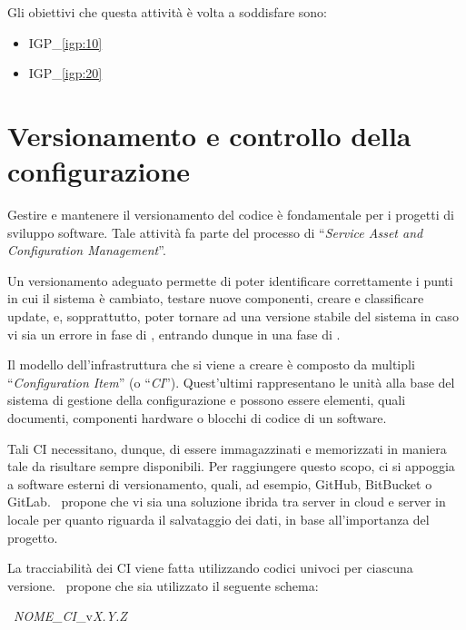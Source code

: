 		Gli obiettivi che questa attività è volta a soddisfare sono:
		\begin{itemize}[noitemsep]
			\renewcommand\labelitemi{--}
			\item {\color{pantone}IGP\_\ref{igp:10}}
			\item {\color{pantone}IGP\_\ref{igp:20}}
		\end{itemize}

\newpage
\section{Versionamento e controllo della configurazione}\label{sec:configurazione}

	Gestire e mantenere il versionamento del codice è fondamentale per i progetti di sviluppo software.	
	Tale attività fa parte del processo di ``\textit{Service Asset and Configuration Management}''.
	
	Un versionamento adeguato permette di poter identificare correttamente i punti in cui il sistema è cambiato, testare nuove componenti, creare e classificare update, e, sopprattutto, poter tornare ad una versione stabile del sistema in caso vi sia un errore in fase di \rollout, entrando dunque in una fase di \rollback.
	
	Il modello dell'infrastruttura che si viene a creare è composto da multipli ``\textit{Configuration Item}'' (o ``\textit{CI}'').
	Quest'ultimi rappresentano le unità alla base del sistema di gestione della configurazione e possono essere elementi, quali documenti, componenti hardware o blocchi di codice di un software.
	
	Tali CI necessitano, dunque, di essere immagazzinati e memorizzati in maniera tale da risultare sempre disponibili.
	Per raggiungere questo scopo, ci si appoggia a software esterni di versionamento, quali, ad esempio, GitHub\cite{github}, BitBucket\cite{bitbucket} o GitLab\cite{gitlab}.
	\azienda~propone che vi sia una soluzione ibrida tra server in cloud e server in locale per quanto riguarda il salvataggio dei dati, in base all'importanza del progetto.
	
	La tracciabilità dei CI viene fatta utilizzando codici univoci per ciascuna versione.
	\azienda~propone che sia utilizzato il seguente schema:
	
	\begin{center}
		\vspace{-2mm}
		{\Large~\textit{NOME\_CI}\_v\textit{X.Y.Z}}
		\vspace{-2mm}
	\end{center}
	
